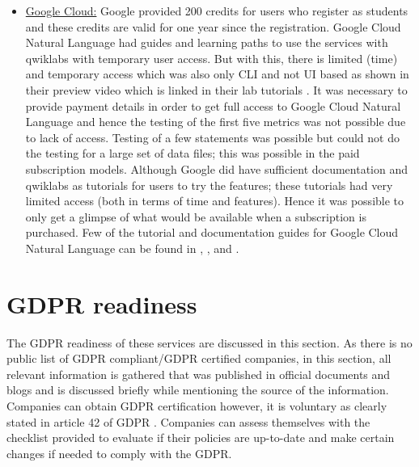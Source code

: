 \begin{itemize}
    \item \underline{Google Cloud:} Google provided 200 credits for users who register as students and these credits are valid for one year since the registration. Google Cloud Natural Language had guides and learning paths to use the services with qwiklabs with temporary user access. But with this, there is limited (time) and temporary access which was also only \ac{CLI} and not \ac{UI} based as shown in their preview video \cite{gcpreviewvideo} which is linked in their lab tutorials \cite{gcqwiklab}.
     It was necessary to provide payment details in order to get full access to Google Cloud Natural Language and hence the testing of the first five metrics was not possible due to lack of access.
     Testing of a few statements was possible but could not do the testing for a large set of data files; this was possible in the paid subscription models. Although Google did have sufficient documentation and qwiklabs as tutorials for users to try the features; these tutorials had very limited access (both in terms of time and features). Hence it was possible to only get a glimpse of what would be available when a subscription is purchased. Few of the tutorial and documentation guides for Google Cloud Natural Language can be found in \cite{gcdocs1} \cite{gcdocs2}, \cite{gcdocs3}, \cite{gcinsights} and \cite{gcqwiklab}.
\end{itemize}

\section{\acs{GDPR} readiness}
The \acs{GDPR} readiness of these services are discussed in this section. As there is no public list of \acs{GDPR} compliant/\acs{GDPR} certified companies, in this section, all relevant information is gathered that was published in official documents and blogs and is discussed briefly while mentioning the source of the information. Companies can obtain \acs{GDPR} certification however, it is voluntary as clearly stated in article 42 of \acs{GDPR} \cite{gdprart42}. Companies can assess themselves with the checklist \cite{gdprchecklist} provided to evaluate if their policies are up-to-date and make certain changes if needed to comply with the \acs{GDPR}.

